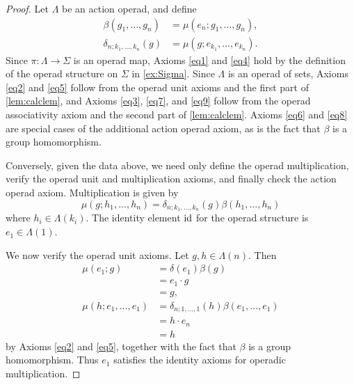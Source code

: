 \begin{proof}
Let $\Lambda$ be an action operad, and define 
\begin{align*}\label{eqn:bd-from-aop}
\beta(g_1, \ldots, g_n) & = \mu(e_n; g_1, \ldots, g_n),\\
\delta_{n; k_1, \ldots, k_n}(g) & = \mu(g; e_{k_1}, \ldots, e_{k_n}).
\end{align*}
Since $\pi \colon \Lambda \rightarrow \Sigma$ is an operad map, Axioms \eqref{eq1} and \eqref{eq4} hold by the definition of the operad structure on $\Sigma$ in \cref{ex:Sigma}. 
Since $\Lambda$ is an operad of sets, Axioms \eqref{eq2} and \eqref{eq5} follow from the operad unit axioms and the first part of \cref{lem:calclem}, and Axioms \eqref{eq3}, \eqref{eq7}, and \eqref{eq9} follow from the operad associativity axiom and the second part of \cref{lem:calclem}. Axioms \eqref{eq6} and \eqref{eq8} are special cases of the additional action operad axiom, as is the fact that $\beta$ is a group homomorphism.

Conversely, given the data above, we need only define the operad multiplication, verify the operad unit and multiplication axioms, and finally check the action operad axiom. Multiplication is given by
  \begin{equation}\label{eqn:mu-from-betadelta}
    \mu(g; h_{1}, \ldots, h_{n}) = \delta_{n; k_{1}, \ldots, k_{n}}(g) \beta(h_{1}, \ldots, h_{n})
  \end{equation}
where $h_{i} \in \Lambda(k_{i})$. The identity element $\textrm{id}$ for the operad structure is $e_1 \in \Lambda(1)$.

We now verify the operad unit axioms. Let $g, h \in \Lambda(n)$. Then
  \begin{align*}
    \mu(e_1; g) &= \delta(e_1)\beta(g) \\
    &= e_1 \cdot g \\
    &= g, \\
    \mu(h; e_1, \ldots, e_1) &= \delta_{n; 1, \ldots, 1}(h)\beta(e_1, \ldots, e_1) \\
    &= h \cdot e_n \\
    &= h
  \end{align*}
by Axioms \eqref{eq2} and \eqref{eq5}, together with the fact that $\beta$ is a group homomorphism.
Thus $e_1$ satisfies the identity axioms for operadic multiplication.


\end{proof}
